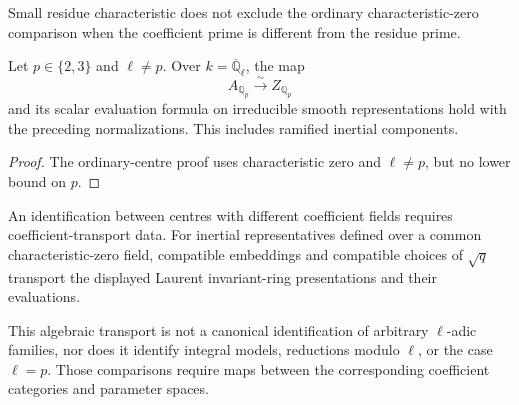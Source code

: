 Small residue characteristic does not exclude the
ordinary characteristic-zero comparison when the
coefficient prime is different from the residue
prime.

\begin{theorem}[ordinary local comparison at \(p=2,3\)]
\label{v4-arith:w10-e:thm:bcglue-local-wild}
\ClaimStatusProvedHere
Let \(p\in\{2,3\}\) and \(\ell\neq p\).
Over \(k=\overline{\mathbb Q}_{\ell}\), the map
\[
 A_{\mathbb Q_p}\xrightarrow{\sim}Z_{\mathbb Q_p}
\]
and its scalar evaluation formula on irreducible
smooth representations hold with the preceding
normalizations. This includes ramified inertial
components.
\end{theorem}

\begin{proof}
The ordinary-centre proof uses characteristic zero
and \(\ell\neq p\), but no lower bound on \(p\).
\end{proof}

\begin{remark}
\label{v4-arith:w10-e:rem:ell-independence}
An identification between centres with different
coefficient fields requires coefficient-transport
data. For inertial representatives defined over a
common characteristic-zero field, compatible
embeddings and compatible choices of \(\sqrt q\)
transport the displayed Laurent invariant-ring
presentations and their evaluations.

This algebraic transport is not a canonical
identification of arbitrary \(\ell\)-adic families,
nor does it identify integral models, reductions
modulo \(\ell\), or the case \(\ell=p\).
Those comparisons require maps between the
corresponding coefficient categories and parameter
spaces.
\end{remark}


